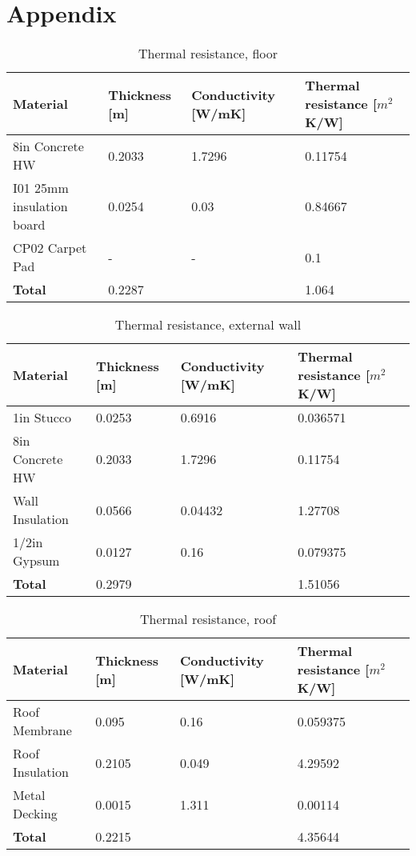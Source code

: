 \chapter*{Appendix}
\begin{table}[h!]
    \centering
        \caption{Thermal resistance, floor}
    \begin{tabular}{p{2cm}|p{1.8cm}|p{2.5cm}|p{2cm}}
         \textbf{Material} & \textbf{Thickness [m]} & \textbf{Conductivity} [W/mK] & \textbf{Thermal resistance [$m^2$K/W]} \\
         \hline
         8in Concrete HW & 0.2033 & 1.7296 & 0.11754 \\
         \hline
         I01 25mm insulation board & 0.0254 & 0.03 & 0.84667 \\
         \hline
         CP02 Carpet Pad & - & - & 0.1 \\
         \hline
         \textbf{Total} & 0.2287 & & 1.064 \\
    \end{tabular}
    \label{tab:Rvalue, floor}
\end{table}

\begin{table}[h!]
    \centering
        \caption{Thermal resistance, external wall}
    \begin{tabular}{p{2cm}|p{1.8cm}|p{2.5cm}|p{2cm}}
         \textbf{Material} & \textbf{Thickness [m]} & \textbf{Conductivity} [W/mK] & \textbf{Thermal resistance [$m^2$K/W]} \\
         \hline
         1in Stucco & 0.0253 & 0.6916 & 0.036571 \\
         \hline
         8in Concrete HW & 0.2033 & 1.7296 & 0.11754 \\
         \hline
         Wall Insulation & 0.0566 & 0.04432 & 1.27708 \\
         \hline
         1/2in Gypsum & 0.0127 & 0.16 & 0.079375 \\
         \hline
         \textbf{Total} & 0.2979 & & 1.51056 \\
    \end{tabular}
    \label{tab:Rvalue, wall}
\end{table}

\begin{table}[h!]
    \centering
        \caption{Thermal resistance, roof}
    \begin{tabular}{p{2cm}|p{1.8cm}|p{2.5cm}|p{2cm}}
         \textbf{Material} & \textbf{Thickness [m]} & \textbf{Conductivity} [W/mK] & \textbf{Thermal resistance [$m^2$K/W]} \\
         \hline
         Roof Membrane & 0.095 & 0.16 & 0.059375 \\
         \hline
         Roof Insulation & 0.2105 & 0.049 & 4.29592 \\
         \hline
         Metal Decking & 0.0015 & 1.311 & 0.00114 \\
         \hline
         \textbf{Total} & 0.2215 & & 4.35644 \\
    \end{tabular}
    \label{tab:Rvalue, roof}
\end{table}

